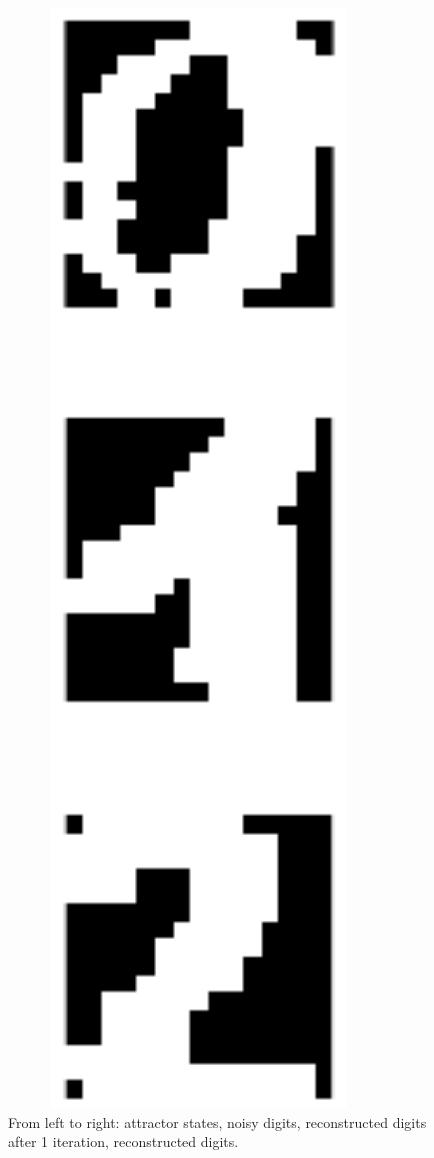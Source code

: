 \documentclass[pdftex,11pt,a4paper]{article}
\begin{document}
\begin{figure}[htb]
\begin{minipage}{0.08\textwidth}
\end{minipage}%
\begin{minipage}{0.08\textwidth}
\includegraphics[width=0.9\textwidth]{figs/reconstructed.png}
\end{minipage}%
\caption{From left to right: attractor states, noisy digits, reconstructed digits after 1 iteration, reconstructed digits.}
\end{figure}
\end{document}
